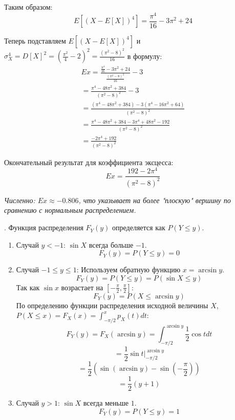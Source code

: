 \documentclass[a4paper,14pt]{extarticle}
\begin{document}
            Таким образом:
            $$
            E[(X - E[X])^4] = \frac{\pi^4}{16} - 3\pi^2 + 24
            $$
            
            Теперь подставляем $E[(X - E[X])^4]$ и $\sigma_X^4 = D[X]^2 = \left(\frac{\pi^2}{4} - 2\right)^2 = \frac{(\pi^2 - 8)^2}{16}$ в формулу:
            \begin{gather*}
                Ex = \frac{\frac{\pi^4}{16} - 3\pi^2 + 24}{\frac{(\pi^2 - 8)^2}{16}} - 3 \\
                = \frac{\pi^4 - 48\pi^2 + 384}{(\pi^2 - 8)^2} - 3 \\
                = \frac{(\pi^4 - 48\pi^2 + 384) - 3(\pi^4 - 16\pi^2 + 64)}{(\pi^2 - 8)^2} \\
                = \frac{\pi^4 - 48\pi^2 + 384 - 3\pi^4 + 48\pi^2 - 192}{(\pi^2 - 8)^2} \\
                = \frac{-2\pi^4 + 192}{(\pi^2 - 8)^2}
            \end{gather*}
            
            Окончательный результат для коэффициента эксцесса:
            $$
            \boxed{Ex = \frac{192 - 2\pi^4}{(\pi^2 - 8)^2}}
            $$
            
            \textit{Численно: $Ex \approx -0.806$, что указывает на более "плоскую" вершину по сравнению с нормальным распределением.}
            
            . Функция распределения $F_Y(y)$ определяется как $P(Y \le y)$.
            
            \begin{enumerate}
                \item Случай $y < -1$: $\sin X$ всегда больше $-1$.
                $$
                F_Y(y) = P(Y \le y) = 0
                $$
                \item Случай $-1 \le y \le 1$: Используем обратную функцию $x = \arcsin y$.
                $$
                F_Y(y) = P(Y \le y) = P(\sin X \le y)
                $$
                Так как $\sin x$ возрастает на $\left[-\frac{\pi}{2}, \frac{\pi}{2}\right]$:
                $$
                F_Y(y) = P(X \le \arcsin y)
                $$
                По определению функции распределения исходной величины $X$, $P(X \le x) = F_X(x) = \int_{-\pi/2}^{x} p_X(t) dt$:
                $$
                F_Y(y) = F_X(\arcsin y) = \int_{-\pi/2}^{\arcsin y} \frac{1}{2} \cos t dt
                $$
                \[ = \frac{1}{2} \sin t|_{-\pi/2}^{\arcsin y} \]
                \[ = \frac{1}{2} \left( \sin(\arcsin y) - \sin\left(-\frac{\pi}{2}\right) \right) \]
                \[ = \frac{1}{2}(y + 1)\]
                
                \item Случай $y > 1$: $\sin X$ всегда меньше $1$.
                $$
                F_Y(y) = P(Y \le y) = 1
                $$
            \end{enumerate}
            
\end{document}
